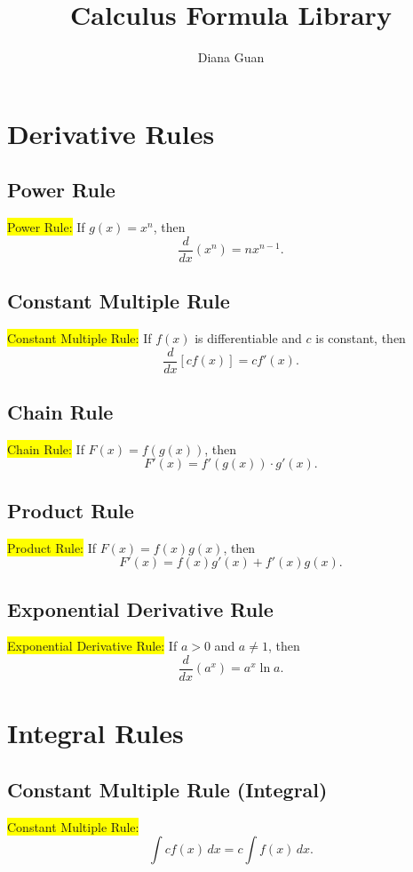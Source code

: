 \documentclass{article}
\title{Calculus Formula Library}
\author{Diana Guan}
\date{}
\begin{document}
\maketitle

\section{Derivative Rules}

\subsection*{Power Rule}
\colorbox{yellow}{Power Rule:}
If $g(x)=x^n$, then
\[
\frac{d}{dx}(x^n)=nx^{n-1}.
\]

\subsection*{Constant Multiple Rule}
\colorbox{yellow}{Constant Multiple Rule:}
If $f(x)$ is differentiable and $c$ is constant, then
\[
\frac{d}{dx}[c f(x)]=c f'(x).
\]

\subsection*{Chain Rule}
\colorbox{yellow}{Chain Rule:}
If $F(x)=f(g(x))$, then
\[
F'(x)=f'(g(x))\cdot g'(x).
\]

\subsection*{Product Rule}
\colorbox{yellow}{Product Rule:}
If $F(x)=f(x)g(x)$, then
\[
F'(x)=f(x)g'(x)+f'(x)g(x).
\]

\subsection*{Exponential Derivative Rule}
\colorbox{yellow}{Exponential Derivative Rule:}
If $a>0$ and $a\neq1$, then
\[
\frac{d}{dx}(a^x)=a^x\ln a.
\]

\section{Integral Rules}

\subsection*{Constant Multiple Rule (Integral)}
\colorbox{yellow}{Constant Multiple Rule:}
\[
\int c f(x)\,dx = c\int f(x)\,dx.
\]
\end{document}
